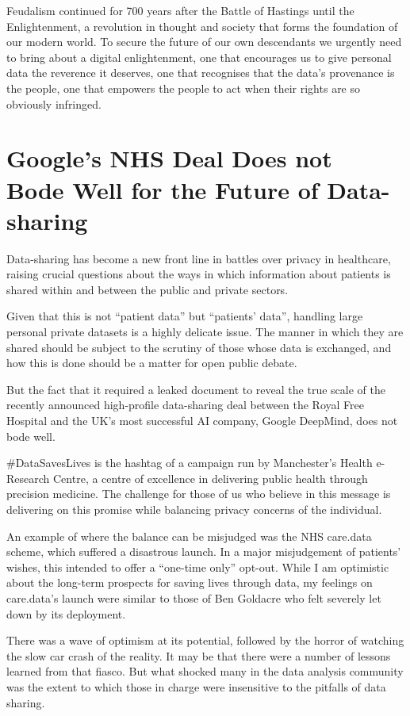 \documentclass[a4paper]{caesar_book}
\let\oldchapter\chapter
\def\chapter{%
  \setcounter{footnote}{0}%
  \oldchapter
}
\begin{document}
Feudalism continued for 700 years after the Battle of Hastings until the Enlightenment, a revolution in thought and society that forms the foundation of our modern world. To secure the future of our own descendants we urgently need to bring about a digital enlightenment, one that encourages us to give personal data the reverence it deserves, one that recognises that the data’s provenance is the people, one that empowers the people to act when their rights are so obviously infringed.

\chapter{Google's NHS Deal Does not\\Bode Well for the Future of Data-sharing}

Data-sharing has become a new front line in battles over privacy in healthcare, raising crucial questions about the ways in which information about patients is shared within and between the public and private sectors.

Given that this is not “patient data” but “patients’ data”, handling large personal private datasets is a highly delicate issue. The manner in which they are shared should be subject to the scrutiny of those whose data is exchanged, and how this is done should be a matter for open public debate.

But the fact that it required a leaked document to reveal the true scale of the recently announced high-profile data-sharing deal between the Royal Free Hospital and the UK’s most successful AI company, Google DeepMind, does not bode well.

\#DataSavesLives is the hashtag of a campaign run by Manchester’s Health e-Research Centre, a centre of excellence in delivering public health through precision medicine. The challenge for those of us who believe in this message is delivering on this promise while balancing privacy concerns of the individual.

An example of where the balance can be misjudged was the NHS care.data scheme, which suffered a disastrous launch. In a major misjudgement of patients’ wishes, this intended to offer a “one-time only” opt-out. While I am optimistic about the long-term prospects for saving lives through data, my feelings on care.data’s launch were similar to those of Ben Goldacre who felt severely let down by its deployment.

There was a wave of optimism at its potential, followed by the horror of watching the slow car crash of the reality. It may be that there were a number of lessons learned from that fiasco. But what shocked many in the data analysis community was the extent to which those in charge were insensitive to the pitfalls of data sharing.
\end{document}
